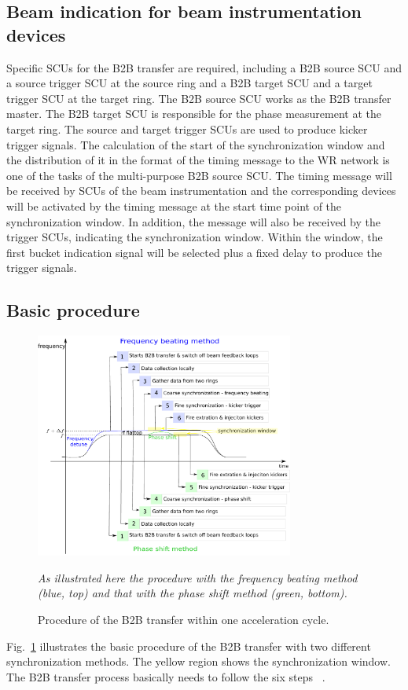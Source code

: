 \subsection{Beam indication for beam instrumentation devices}
Specific SCUs for the B2B transfer are required, including a B2B source SCU and a source trigger SCU at the source ring and a B2B target SCU and a target trigger SCU at the target ring. The B2B source SCU works as the B2B transfer master. The B2B target SCU is responsible for the phase measurement at the target ring. The source and target trigger SCUs are used to produce kicker trigger signals. The calculation of the start of the synchronization window and the distribution of it in the format of the timing message to the WR network is one of the tasks of the multi-purpose B2B source SCU. The timing message will be received by SCUs of the beam instrumentation and the corresponding devices will be activated by the timing message at the start time point of the synchronization window. In addition, the message will also be received by the trigger SCUs, indicating the synchronization window. Within the window, the first bucket indication signal will be selected plus a fixed delay to produce the trigger signals.
\subsection{Basic procedure}
\begin{figure}[!htb]
   \centering   
   \includegraphics*[width=85mm]{procedure.pdf}
   \caption{Procedure of the B2B transfer within one acceleration cycle.}
	{\textsl{\small{As illustrated here the procedure with the frequency beating method (blue, top) and that with the phase shift method (green, bottom).}}}
   \label{procedure}
\end{figure}

Fig.~\ref{procedure} illustrates the basic procedure of the B2B transfer with two different synchronization methods. The yellow region shows the synchronization window. The B2B transfer process basically needs to follow the six steps ~\cite{bai_f-tc-c-05_2016}.

